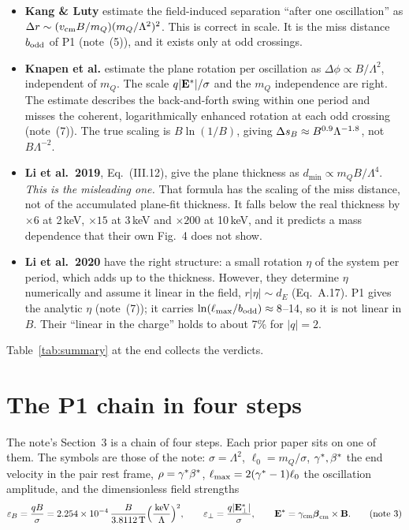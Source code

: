 \documentclass[11pt]{article}
\begin{document}
\begin{itemize}
\item \textbf{Kang \& Luty} estimate the field-induced separation ``after one oscillation'' as $\Delta r\sim(v_{\rm cm}B/m_Q)(m_Q/\Lambda^2)^2$.
  This is correct in scale. It is the miss distance $b_{\rm odd}$ of P1 (note~(5)), and it exists only at odd crossings.
\item \textbf{Knapen et al.} estimate the plane rotation per oscillation as $\Delta\phi\propto B/\Lambda^2$, independent of $m_Q$.
  The scale $q|\mathbf{E}^*|/\sigma$ and the $m_Q$ independence are right. The estimate describes the back-and-forth swing within one period and
  misses the coherent, logarithmically enhanced rotation at each odd crossing (note~(7)). The true scaling is
  $B\ln(1/B)$, giving $\Delta s_B\approx B^{0.9}\Lambda^{-1.8}$, not $B\Lambda^{-2}$.
\item \textbf{Li et al.\ 2019}, Eq.~(III.12), give the plane thickness as $d_{\min}\propto m_Q B/\Lambda^4$.
  \emph{This is the misleading one.} That formula has the scaling of the miss distance, not of the accumulated plane-fit
  thickness. It falls below the real thickness by $\times6$ at 2\,keV, $\times15$ at 3\,keV and $\times200$ at 10\,keV, and it predicts a mass dependence that their own Fig.~4 does not show.
\item \textbf{Li et al.\ 2020} have the right structure: a small rotation $\eta$ of the system per period, which adds up to the
  thickness. However, they determine $\eta$ numerically and assume it linear in the field, $r|\eta|\sim d_E$ (Eq.~A.17). P1 gives the
  analytic $\eta$ (note~(7)); it carries $\ln(\ell_{\max}/b_{\rm odd})\approx8$--14, so it is not linear in $B$. Their ``linear in the charge'' holds to
  about 7\% for $|q|=2$.
\end{itemize}

Table~\ref{tab:summary} at the end collects the verdicts.

\section{The P1 chain in four steps}\label{sec:chain}

The note's Section~3 is a chain of four steps. Each prior paper sits on one of them. The symbols are those of the note:
$\sigma=\Lambda^2$, $\ell_0=m_Q/\sigma$, $\gamma^*,\beta^*$ the end velocity in the pair rest frame, $\rho=\gamma^*\beta^*$,
$\ell_{\max}=2(\gamma^*-1)\ell_0$ the oscillation amplitude, and the dimensionless field strengths
\begin{equation}
  \varepsilon_B=\frac{qB}{\sigma}=2.254\times10^{-4}\,\frac{B}{3.8112\,\mathrm{T}}\Big(\frac{\,\mathrm{keV}}{\Lambda}\Big)^2,\qquad
  \varepsilon_\perp=\frac{q|\mathbf{E}^*_\perp|}{\sigma},\qquad \mathbf{E}^*=\gamma_{\rm cm}\boldsymbol\beta_{\rm cm}\times\mathbf B . \tag{note 3}
\end{equation}
\end{document}

